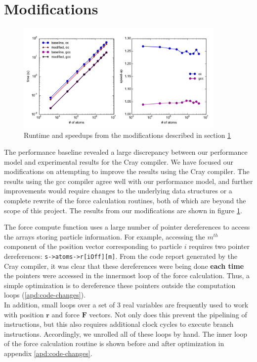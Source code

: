 \documentclass[12pt]{article}
\begin{document}
\section{Modifications}
\label{sec:mods}

\begin{figure}[h!]
  \centering
  \includegraphics[width=0.9\textwidth]{../figs/modified_forceLJ.pdf}
  \caption{Runtime and speedups from the modifications described in
   section \ref{sec:mods}}
   \label{fig:mod-force}
\end{figure}

The performance baseline revealed a large discrepancy between our
performance model and experimental results for the Cray compiler. We
have focused our modifications on attempting to improve the results
using the Cray compiler. The results using the gcc compiler agree well
with our performance model, and further improvements would require
changes to the underlying data structures or a complete rewrite of the
force calculation routines, both of which are beyond the scope of this
project. The results from our modifications are shown in figure
\ref{fig:mod-force}.

 The force compute function uses a large number of pointer dereferences
to access the arrays storing particle information. For example, accessing the $m^{th}$ 
component of the position vector corresponding to particle $i$ requires two pointer 
dereferences: \texttt{s->atoms->r[iOff][m]}. From the code report generated by the Cray 
compiler, it was clear that these dereferences were being done {\bf each time} the
pointers were accessed in the innermost loop of the force calculation. 
Thus, a simple optimization is to dereference these pointers outside the computation 
loops (\ref{apd:code-changes}). \\

 In addition, small loops over a set of 3 real variables are frequently used to
work with position $\bm{r}$ and force $\textbf{F}$ vectors. Not only does this prevent the pipelining
of instructions, but this also requires additional clock cycles to execute branch instructions.
Accordingly, we unrolled all of these loops by hand. The inner loop of the force calculation 
routine is shown before and after optimization in appendix \ref{apd:code-changes}. \\
\end{document}
